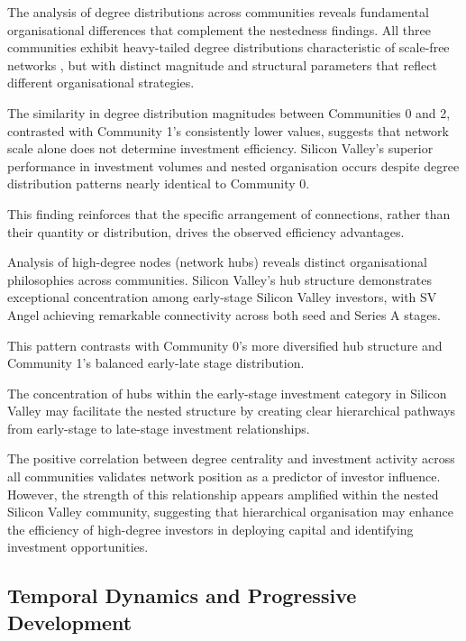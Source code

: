 The analysis of degree distributions across communities reveals fundamental organisational differences that complement the nestedness findings. All three communities exhibit heavy-tailed degree distributions characteristic of scale-free networks \cite{Barabasi1999,Borgatti2009}, but with distinct magnitude and structural parameters that reflect different organisational strategies.

The similarity in degree distribution magnitudes between Communities 0 and 2, contrasted with Community 1's consistently lower values, suggests that network scale alone does not determine investment efficiency. Silicon Valley's superior performance in investment volumes and nested organisation occurs despite degree distribution patterns nearly identical to Community 0. 

This finding reinforces that the specific arrangement of connections, rather than their quantity or distribution, drives the observed efficiency advantages.

Analysis of high-degree nodes (network hubs) reveals distinct organisational philosophies across communities. Silicon Valley's hub structure demonstrates exceptional concentration among early-stage Silicon Valley investors, with SV Angel achieving remarkable connectivity across both seed and Series A stages. 

This pattern contrasts with Community 0's more diversified hub structure and Community 1's balanced early-late stage distribution. 

The concentration of hubs within the early-stage investment category in Silicon Valley may facilitate the nested structure by creating clear hierarchical pathways from early-stage to late-stage investment relationships.

The positive correlation between degree centrality and investment activity across all communities validates network position as a predictor of investor influence. However, the strength of this relationship appears amplified within the nested Silicon Valley community, suggesting that hierarchical organisation may enhance the efficiency of high-degree investors in deploying capital and identifying investment opportunities.

\subsection{Temporal Dynamics and Progressive Development}


